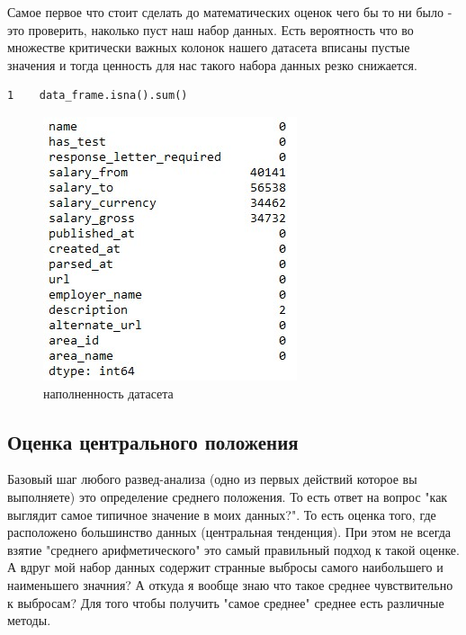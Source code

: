 \documentclass[12pt, a4paper]{article}
\begin{document}
{Самое первое что стоит сделать до математических оценок 
чего бы то ни было - это проверить, 
наколько пуст наш набор данных. 
Есть вероятность что во множестве критически важных 
колонок нашего датасета вписаны пустые значения и тогда 
ценность для нас такого набора данных резко снижается.

\newpage

\begin{verbatim}
1    data_frame.isna().sum()
\end{verbatim}

\begin{figure}[h]
    \begin{center}
        \includegraphics[scale=1,keepaspectratio]
        {Pictures/Picture_5.jpg}
        \caption{наполненность датасета}
        \label{Picture_5}
    \end{center}
\end{figure}

\subsection{Оценка центрального положения}

Базовый шаг любого развед-анализа (одно из первых действий 
которое вы выполняете) это определение среднего положения. 
То есть ответ на вопрос "как выглядит самое типичное значение 
в моих данных?". То есть оценка того, где расположено 
большинство данных (центральная тенденция). При этом не всегда 
взятие "среднего арифметического" это самый правильный подход 
к такой оценке. А вдруг мой набор данных содержит странные 
выбросы самого наибольшего и наименьшего значния? А откуда я 
вообще знаю что такое среднее чувствительно к выбросам?
Для того чтобы получить "самое среднее" среднее есть 
различные методы.

}
\end{document}
